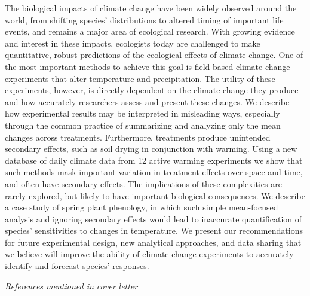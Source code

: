 \documentclass[11pt,a4paper]{letter}
\begin{document}
\begin{letter}{}
The biological impacts of climate change have been widely observed around the world, from shifting species' distributions to altered timing of important life events, and remains a major area of ecological research. With growing evidence and interest in these impacts, ecologists today are challenged to make quantitative, robust predictions of the ecological effects of climate change. One of the most important methods to achieve this goal is field-based climate change experiments that alter temperature and precipitation. The utility of these experiments, however, is directly dependent on the climate change they produce and how accurately researchers assess and present these changes. We describe how experimental results may be interpreted in misleading ways, especially through the common practice of summarizing and analyzing only the mean changes across treatments. Furthermore, treatments produce unintended secondary effects, such as soil drying in conjunction with warming. Using a new database of daily climate data from 12 active warming experiments we show that such methods mask important variation in treatment effects over space and time, and often have secondary effects. The implications of these complexities are rarely explored, but likely to have important biological consequences. We describe a case study of spring plant phenology, in which such simple mean-focused analysis and ignoring secondary effects would lead to inaccurate quantification of species' sensitivities to changes in temperature. We present our recommendations for future experimental design, new analytical approaches, and data sharing that we believe will improve the ability of climate change experiments to accurately identify and forecast species' responses.


\newpage
\noindent \emph{References mentioned in cover letter}
\begin{footnotesize}
{\def\section*#1{}

}
\end{footnotesize}

\end{letter}
\end{document}
